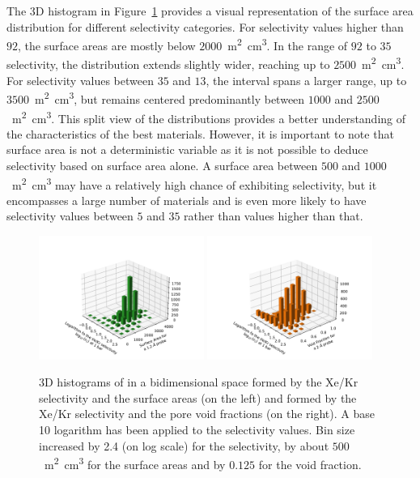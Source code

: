 \documentclass[main.tex]{subfiles}
\begin{document}
The 3D histogram in Figure~\ref{fgr:3D_hist_sa_vol} provides a visual representation of the surface area distribution for different selectivity categories. For selectivity values higher than $92$, the surface areas are mostly below $2000$~\si{\square\meter\cubic\centi\meter}. In the range of $92$ to $35$ selectivity, the distribution extends slightly wider, reaching up to $2500$~\si{\square\meter\cubic\centi\meter}. For selectivity values between $35$ and $13$, the interval spans a larger range, up to $3500$~\si{\square\meter\cubic\centi\meter}, but remains centered predominantly between $1000$ and $2500$~\si{\square\meter\cubic\centi\meter}. This split view of the distributions provides a better understanding of the characteristics of the best materials. However, it is important to note that surface area is not a deterministic variable as it is not possible to deduce selectivity based on surface area alone. A surface area between $500$ and $1000$~\si{\square\meter\cubic\centi\meter} may have a relatively high chance of exhibiting selectivity, but it encompasses a large number of materials and is even more likely to have selectivity values between $5$ and $35$ rather than values higher than that. 
\begin{figure}[ht!]
  \centering
  \includegraphics[width=0.48\textwidth,trim={2cm 0 2cm 2cm},clip]{figures/2-thermo/3D_hist_selec_SA.pdf}
  \hfill
  \includegraphics[width=0.48\textwidth,trim={2cm 0 2cm 2cm},clip]{figures/2-thermo/3D_hist_selec_vol.pdf}
  \caption{3D histograms of in a bidimensional space formed by the Xe/Kr selectivity and the surface areas (on the left) and formed by the Xe/Kr selectivity and the pore void fractions (on the right). A base 10 logarithm has been applied to the selectivity values. Bin size increased by 2.4 (on log scale) for the selectivity, by about $500$~\si{\square\meter\cubic\centi\meter} for the surface areas and by $0.125$ for the void fraction. }\label{fgr:3D_hist_sa_vol}
\end{figure}
\end{document}
